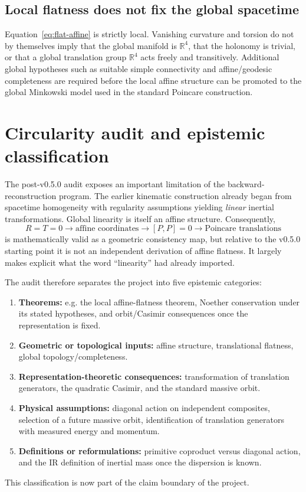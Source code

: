 \documentclass[11pt,a4paper]{article}
\begin{document}
\subsection{Local flatness does not fix the global spacetime}
Equation~\eqref{eq:flat-affine} is strictly local.  Vanishing curvature and torsion do not by themselves imply that the global manifold is $\mathbb R^4$, that the holonomy is trivial, or that a global translation group $\mathbb R^4$ acts freely and transitively.  Additional global hypotheses such as suitable simple connectivity and affine/geodesic completeness are required before the local affine structure can be promoted to the global Minkowski model used in the standard Poincare construction.

\section{Circularity audit and epistemic classification}
The post-v0.5.0 audit exposes an important limitation of the backward-reconstruction program.  The earlier kinematic construction already began from spacetime homogeneity with regularity assumptions yielding \emph{linear} inertial transformations.  Global linearity is itself an affine structure.  Consequently,
\begin{equation}
R=T=0\longrightarrow\text{affine coordinates}
\longrightarrow[P,P]=0
\longrightarrow\text{Poincare translations}
\end{equation}
is mathematically valid as a geometric consistency map, but relative to the v0.5.0 starting point it is not an independent derivation of affine flatness.  It largely makes explicit what the word ``linearity'' had already imported.

The audit therefore separates the project into five epistemic categories:
\begin{enumerate}
\item \textbf{Theorems:} e.g. the local affine-flatness theorem, Noether conservation under its stated hypotheses, and orbit/Casimir consequences once the representation is fixed.
\item \textbf{Geometric or topological inputs:} affine structure, translational flatness, global topology/completeness.
\item \textbf{Representation-theoretic consequences:} transformation of translation generators, the quadratic Casimir, and the standard massive orbit.
\item \textbf{Physical assumptions:} diagonal action on independent composites, selection of a future massive orbit, identification of translation generators with measured energy and momentum.
\item \textbf{Definitions or reformulations:} primitive coproduct versus diagonal action, and the IR definition of inertial mass once the dispersion is known.
\end{enumerate}
This classification is now part of the claim boundary of the project.
\end{document}
